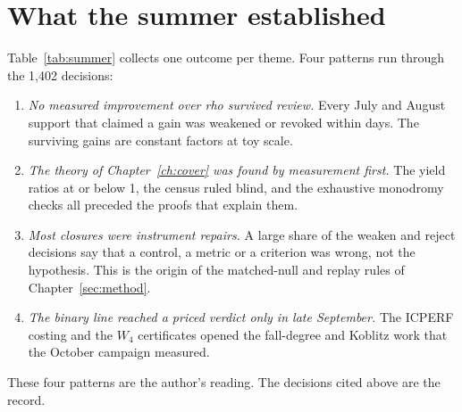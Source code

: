 \section{What the summer established}

Table~\ref{tab:summer} collects one outcome per theme. Four patterns run
through the 1{,}402 decisions:
\begin{enumerate}
\item \emph{No measured improvement over rho survived review.} Every
  July and August support that claimed a gain was weakened or revoked
  within days. The surviving gains are constant factors at toy scale.
\item \emph{The theory of Chapter~\ref{ch:cover} was found by
  measurement first.} The yield ratios at or below 1, the census ruled
  blind, and the exhaustive monodromy checks all preceded the proofs that
  explain them.
\item \emph{Most closures were instrument repairs.} A large share of the
  weaken and reject decisions say that a control, a metric or a criterion
  was wrong, not the hypothesis. This is the origin of the matched-null and
  replay rules of Chapter~\ref{sec:method}.
\item \emph{The binary line reached a priced verdict only in late
  September.} The ICPERF costing and the $W_4$ certificates opened the
  fall-degree and Koblitz work that the October campaign measured.
\end{enumerate}
These four patterns are the author's reading. The decisions cited above
are the record.
